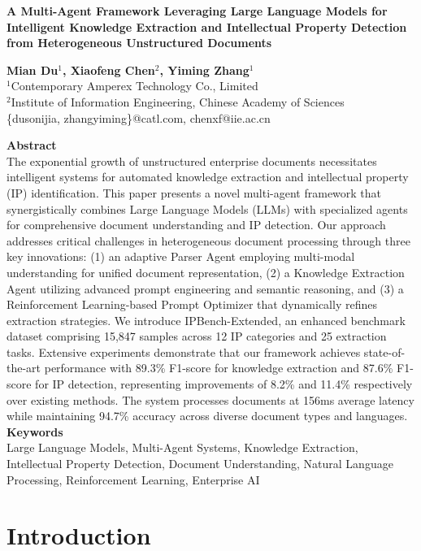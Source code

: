 \documentclass[11pt,a4paper]{article}
\newcommand{\mytitle}[1]{%
  \begin{center}
    {\fontsize{18}{22}\selectfont\bfseries #1}
  \end{center}
  \vspace{18pt}
}
\newcommand{\myauthors}[3]{%
  \begin{center}
    {\fontsize{12}{14}\selectfont\bfseries #1}\\[8pt]
    {\fontsize{11}{13}\selectfont #2}\\[6pt]
    {\fontsize{10}{12}\selectfont\ttfamily #3}\\[12pt]
  \end{center}
}
\newcommand{\myabstract}[1]{%
  {\fontsize{12}{14}\selectfont\bfseries Abstract}\\[6pt]
  {\fontsize{10}{12}\selectfont #1}\\[12pt]
}
\newcommand{\mykeywords}[1]{%
  {\fontsize{12}{14}\selectfont\bfseries Keywords}\\[6pt]
  {\fontsize{10}{12}\selectfont #1}\\[18pt]
}
\begin{document}
\mytitle{A Multi-Agent Framework Leveraging Large Language Models for Intelligent Knowledge Extraction and Intellectual Property Detection from Heterogeneous Unstructured Documents}

\myauthors{Mian Du$^1$, Xiaofeng Chen$^2$, Yiming Zhang$^1$}{%
  $^1$Contemporary Amperex Technology Co., Limited\\
  $^2$Institute of Information Engineering, Chinese Academy of Sciences%
}{%
  \{dusonijia, zhangyiming\}@catl.com, chenxf@iie.ac.cn%
}

\myabstract{%
The exponential growth of unstructured enterprise documents necessitates intelligent systems for automated knowledge extraction and intellectual property (IP) identification. This paper presents a novel multi-agent framework that synergistically combines Large Language Models (LLMs) with specialized agents for comprehensive document understanding and IP detection. Our approach addresses critical challenges in heterogeneous document processing through three key innovations: (1) an adaptive Parser Agent employing multi-modal understanding for unified document representation, (2) a Knowledge Extraction Agent utilizing advanced prompt engineering and semantic reasoning, and (3) a Reinforcement Learning-based Prompt Optimizer that dynamically refines extraction strategies. We introduce IPBench-Extended, an enhanced benchmark dataset comprising 15,847 samples across 12 IP categories and 25 extraction tasks. Extensive experiments demonstrate that our framework achieves state-of-the-art performance with 89.3\% F1-score for knowledge extraction and 87.6\% F1-score for IP detection, representing improvements of 8.2\% and 11.4\% respectively over existing methods. The system processes documents at 156ms average latency while maintaining 94.7\% accuracy across diverse document types and languages.%
}

\mykeywords{Large Language Models, Multi-Agent Systems, Knowledge Extraction, Intellectual Property Detection, Document Understanding, Natural Language Processing, Reinforcement Learning, Enterprise AI}


\section{Introduction}
\end{document}
